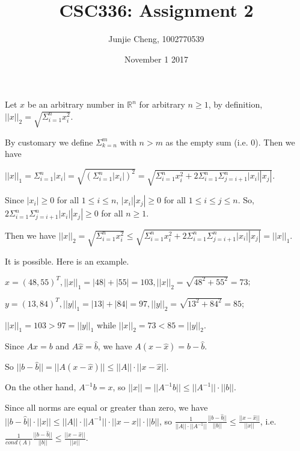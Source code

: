 \documentclass[11pt, answers]{exam}
\title{CSC336: Assignment 2}
\author{Junjie Cheng, 1002770539}
\date{November 1 2017}
\theoremstyle{plain}
\theoremstyle{definition}
\newcommand{\R}{\mathbb{R}}
\begin{document}
\maketitle

\begin{questions}
\question %
Let $x$ be an arbitrary number in $\R^n$ for arbitrary $n \ge 1$, by definition, $||x||_2 = \sqrt{\Sigma_{i=1}^n x_i^2} $. 

By customary we define $\Sigma_{k=n}^m$ with $n>m$ as the empty sum (i.e. $0$). Then we have

$||x||_1 = \Sigma_{i=1}^n |x_i| = \sqrt{(\Sigma_{i=1}^n |x_i|)^2} = \sqrt{\Sigma_{i=1}^n x_i^2 + 2\Sigma_{i=1}^n \Sigma_{j=i+1}^n |x_i||x_j|}$.

Since $|x_i| \ge 0$ for all $1 \le i \le n$, $|x_i||x_j| \ge 0$ for all $1 \le i \le j \le n$. So, $2\Sigma_{i=1}^n \Sigma_{j=i+1}^n |x_i||x_j| \ge 0$ for all $n \ge 1$.

Then we have $||x||_2 = \sqrt{\Sigma_{i=1}^n x_i^2} \le \sqrt{\Sigma_{i=1}^n x_i^2 + 2\Sigma_{i=1}^n \Sigma_{j=i+1}^n |x_i||x_j|} = ||x||_1$.

\question %
It is possible. Here is an example.

$x = (48, 55)^T, ||x||_1 = |48|+|55|= 103, ||x||_2 = \sqrt{48^2+55^2} = 73$;

$y = (13, 84)^T, ||y||_1 = |13|+|84|= 97,  ||y||_2 = \sqrt{13^2+84^2} = 85$;

$||x||_1 = 103 > 97 = ||y||_1$ while $||x||_2 = 73 < 85 = ||y||_2$.

\question %
Since $Ax = b$ and $A\hat{x} = \hat{b}$, we have
$A(x-\hat{x}) = b - \hat{b}$. 

So $||b-\hat{b}|| = ||A(x-\hat{x})|| \le ||A||\cdot||x-\hat{x}||$.

On the other hand, $A^{-1}b = x$, so $||x|| = ||A^{-1}b|| \le ||A^{-1}||\cdot||b||$.

Since all norms are equal or greater than zero, we have $||b-\hat{b}|| \cdot ||x|| \le ||A||\cdot||A^{-1}|| \cdot ||x-\hat{x}|| \cdot ||b||$, so $\frac{1}{||A||\cdot||A^{-1}||}\frac{||b-\hat{b}||}{||b||} \le \frac{||x-\hat{x}||}{||x||}$, i.e. $ \frac{1}{cond(A)}\frac{||b-\hat{b}||}{||b||} \le \frac{||x-\hat{x}||}{||x||}$.
\end{questions}
\end{document}

